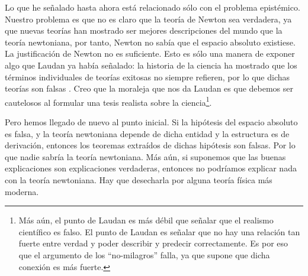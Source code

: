 Lo que he señalado hasta ahora está relacionado sólo con el problema epistémico. Nuestro problema es que no es claro que la teoría de Newton sea verdadera, ya que nuevas teorías han mostrado ser mejores descripciones del mundo que la teoría newtoniana, por tanto, Newton no sabía que el espacio absoluto existiese. La justificación de Newton no es suficiente. Esto es sólo una manera de exponer algo que Laudan ya había señalado: la historia de la ciencia ha mostrado que los términos individuales de teorías exitosas no siempre refieren, por lo que dichas teorías son falsas %
. Creo que la moraleja que nos da Laudan es que debemos ser cautelosos al formular una tesis realista sobre la ciencia\footnote{Más aún, el punto de Laudan es más débil que señalar que el realismo científico es falso. El punto de Laudan es señalar que no hay una relación tan fuerte entre verdad y poder describir y predecir correctamente. Es por eso que el argumento de los ``no-milagros'' falla, ya que supone que dicha conexión es más fuerte.}.

Pero hemos llegado de nuevo al punto inicial. Si la hipótesis del espacio absoluto es falsa, y la teoría newtoniana depende de dicha entidad y la estructura es de derivación, entonces los teoremas extraídos de dichas hipótesis son falsas. Por lo que nadie sabría la teoría newtoniana. Más aún, si suponemos que las buenas explicaciones son explicaciones verdaderas, entonces no podríamos explicar nada con la teoría newtoniana. Hay que desecharla por alguna teoría física más moderna.


